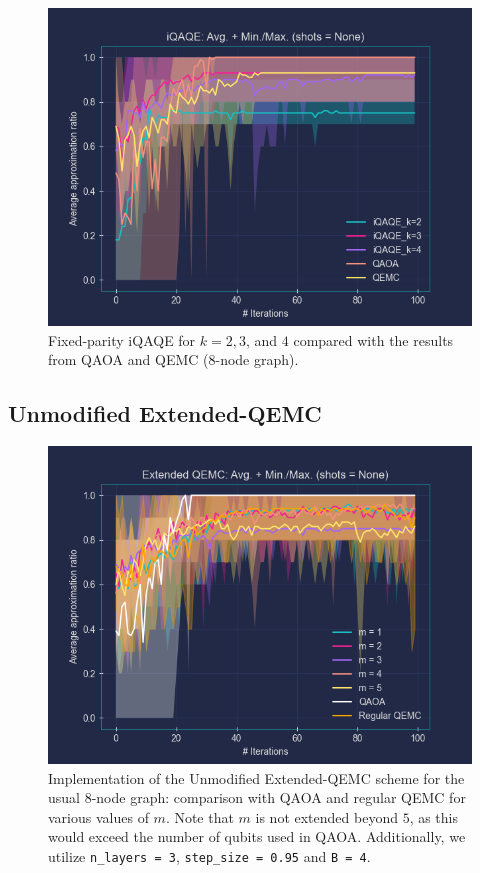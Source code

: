 \begin{figure}[H]
    \centering
    \includegraphics[width=0.95\columnwidth]{Figures/Fixed-parity/k=2_3_4(8-node).png}
    \caption{Fixed-parity iQAQE for $k=2, 3$, and $4$ compared with the results from QAOA and QEMC ($8$-node graph).}
    \label{fig:Fixed-parity/k=2,3,4}
\end{figure}

\subsection{Unmodified Extended-QEMC}
\label{subsection:Vanilla_Extended_QEMC}

\begin{figure}[H]
    \centering
    \includegraphics[width=0.95\columnwidth]{Figures/Extended-QEMC/8-node(n_layers=3, step_size=0.95, m=All).png}
    \caption{Implementation of the Unmodified Extended-QEMC scheme for the usual $8$-node graph: comparison with QAOA and regular QEMC for various values of $m$. Note that $m$ is not extended beyond $5$, as this would exceed the number of qubits used in QAOA. Additionally, we utilize \texttt{n\_layers = 3}, \texttt{step\_size = 0.95} and \texttt{B = 4}.}
    \label{fig:Vanilla_Extended-QEMC}
\end{figure}

